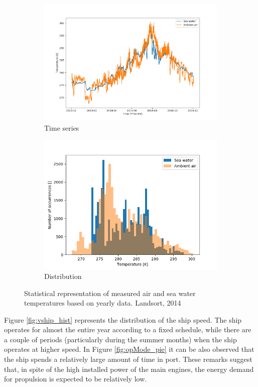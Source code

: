 \documentclass[preprint,12pt]{elsarticle}
\begin{document}
\begin{figure}[htbp]
	\centering
	\begin{subfigure}[b]{0.45\textwidth}
		\centering
		\includegraphics[width=0.999\linewidth]{Figures/Tsea_vs_time}
		\caption{Time series}
		\label{fig:TseaTairTIME}
	\end{subfigure}
	\begin{subfigure}[b]{0.45\textwidth}
		\centering
		\includegraphics[width=0.9\linewidth]{Figures/Tsea_hist}
		\caption{Distribution}
		\label{fig:TseaTairDIST}
	\end{subfigure}
	\caption{Statistical representation of measured air and sea water temperatures based on yearly data. Landsort, 2014}
	\label{fig:TseaTair}
\end{figure}


Figure \ref{fig:vship_hist} represents the distribution of the ship speed. The ship operates for almost  the entire year according to a fixed schedule, while there are a couple of periods (particularly during the summer months) when the ship operates at higher speed. In Figure \ref{fig:opMode_pie} it can be also observed that the ship spends a relatively large amount of time in port. These remarks suggest that, in spite of the high installed power of the main engines, the energy demand for propulsion is expected to be relatively low.
\end{document}

